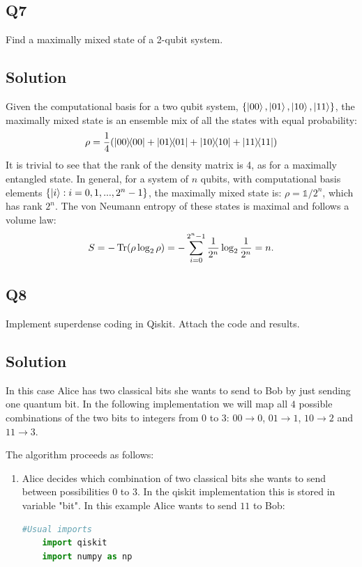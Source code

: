 \documentclass[12pt]{article}
\newcommand*\id{\mathds{1}}
\begin{document}
\begin{appendices}
\subsection*{Q7}
Find a maximally mixed state of a 2-qubit system.

\subsection*{Solution}
Given the computational basis for a two qubit system, $\{ \ket{00}, \ket{01}, \ket{10}, \ket{11} \}$, the maximally mixed state is an ensemble mix of all the states with equal probability:
\begin{equation}
    \rho = \frac{1}{4}(\ketbra{00}{00}+ \ketbra{01}{01}+ \ketbra{10}{10}+ \ketbra{11}{11} )
\end{equation}
It is trivial to see that the rank of the density matrix is 4, as for a maximally entangled state. In general, for a system of $n$ qubits, with computational basis elements $\{ \ket{i} : i = 0, 1, ..., 2^n-1\}$, the maximally mixed state is: $\rho = \id/2^n$, which has rank $2^n$. The von Neumann entropy of these states is maximal and follows a volume law:
\begin{equation}
    S = -\Tr(\rho \log_2 \rho) = -\sum_{i=0}^{2^n-1}\frac{1}{2^n}\log_2 \frac{1}{2^n} = n.
\end{equation}


\subsection*{Q8}
Implement superdense coding in Qiskit. Attach the code and results.

\subsection*{Solution}

In this case Alice has two classical bits she wants to send to Bob by just sending one quantum bit. In the following implementation we will map all $4$ possible combinations of the two bits to integers from $0$ to $3$: $00\rightarrow 0$, $01\rightarrow 1$, $10\rightarrow 2$ and $11\rightarrow 3$.

The algorithm proceeds as follows:
\begin{enumerate}
    \item Alice decides which combination of two classical bits she wants to send between possibilities $0$ to $3$. In the qiskit implementation this is stored in variable "bit". In this example Alice wants to send $11$ to Bob:
    \begin{lstlisting}[language=Python]
    #Usual imports
    import qiskit
    import numpy as np
    

\end{lstlisting}
\end{enumerate}
\end{appendices}
\end{document}
